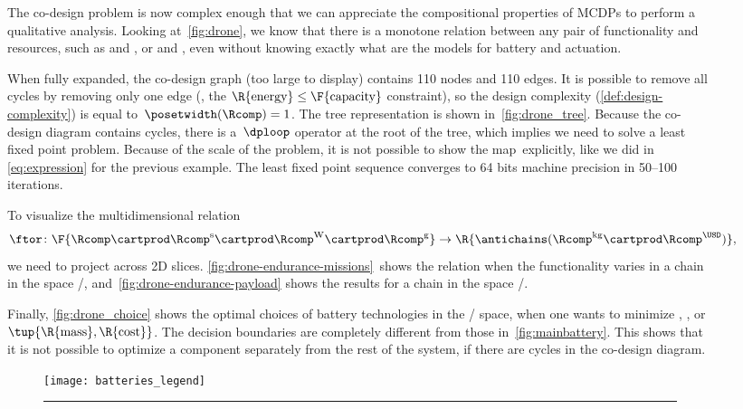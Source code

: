 \begin{figure*}[p]
The co-design problem is now complex enough that we can appreciate
the compositional properties of MCDPs to perform a qualitative analysis.
Looking at~\cref{fig:drone}, we know that there is a monotone relation
between any pair of functionality and resources, such as 
and , or  and , even without knowing
exactly what are the models for battery and actuation.

When fully expanded, the co-design graph (too large to display) contains
110 nodes and 110 edges.
It is possible to remove all cycles by removing
only one edge (\eg , the $\R{\text{energy}}\leq\text{\F{\text{capacity}}}$
constraint), so the design complexity (\cref{def:design-complexity})
is equal to~$\posetwidth(\Rcomp)=1$.
The
tree representation is shown in~\cref{fig:drone_tree}.
Because the co-design diagram contains cycles, there is a~$\dploop$ operator at the root of the tree, which implies we need to solve a least fixed point problem.
Because of the scale of the problem, it is not possible to show the map~\ftor explicitly, like we did in \cref{eq:expression} for the previous example.
The least fixed point sequence converges to 64 bits machine precision in 50--100 iterations.

To visualize the multidimensional relation
\begin{equation*}
    \ftor\colon\F{\Rcomp\cartprod\Rcomp^{\text{s}}\cartprod\Rcomp^{\text{W}}\cartprod\Rcomp^{\text{g}}}\rightarrow\R{\antichains(\Rcomp^{\text{kg}}\cartprod\Rcomp^{\USD})},
\end{equation*}
we need to project across 2D slices.
\cref{fig:drone-endurance-missions}~shows
the relation when the functionality varies in a chain in the space
/, and~\cref{fig:drone-endurance-payload}
shows the results for a chain in the space /.

Finally, \cref{fig:drone_choice} shows the optimal choices of battery technologies in the / space, when one wants to minimize , , or~$\tup{ \R{\text{mass}},\R{\text{cost}}} $.
The decision boundaries are completely different from those in~\cref{fig:mainbattery}.
This shows that it is not possible to optimize a component separately from the rest of the system, if there are cycles in the co-design diagram.

\begin{figure*}
    \begin{centering}
        \hfill\texttt{[image: batteries\_legend]}\rule{2cm}{0pt}


\end{centering}
\end{figure*}
\end{figure*}
